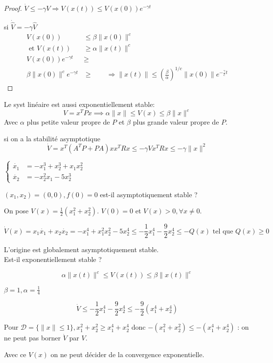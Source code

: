 \documentclass[main.tex]{subfiles} \newcommand{\D}{\mathcal{D}}
\begin{document}
\begin{proof} $\dot{V} \leq -\gamma V \Rightarrow V(x(t)) \leq
	V(x(0))e^{-\gamma t}$

  si $\dot{\hat{V}}=-\gamma \hat{V}$ \begin{align*} V(x(0)) & \leq \beta
	  \|x(0)\|^c \\ \text{ et } V(x(t)) & \geq \alpha \|x(t)\|^c \\
	  V(x(0))e^{-\gamma t} & \geq \\ \beta\|x(0)\|^c e^{-\gamma t} & \geq
	  \qquad \Rightarrow \|x(t)\| \leq
	  (\frac{\beta}{\alpha})^{1/c}\|x(0)\|e^{-\frac{\gamma}{c}t} \end{align*}
\end{proof}

\begin{corol} Le syst linéaire est aussi exponentiellement stable: \[ V = x^T P
x \implies \alpha \|x\| \le V(x) \le \beta \|x\|^c \] Avec $\alpha$ plus petite
valeur propre de $P$ et $\beta$ plus grande valeur propre de $P$.  \end{corol}
si on a la stabilité asymptotique \[ \dot{V}=x^T(A^TP+PA)x x^T R x \le -\gamma
V x^T R x \le -\gamma \|x\|^2 \] \begin{exemple} $\begin{cases} \dot{x_1} & =
	-x_1^3 + x_2 ^3 + x_1x_2^2\\\dot{x_2} & = - x_2^2 x_1 - 5x_2^3 \end{cases}$


  $(x_1,x_2)=(0,0),f(0)=0$ est-il asymptotiquement stable ?

  On pose $V(x) = \frac{1}{2}(x_1^2 + x_2^2)$. $V(0) = 0$ et $V(x)>0, \forall x
  \neq 0$.

  \[ \dot{V}(x) = x_1\dot{x_1} + x_2 \dot{x_2} = -x_1^4 + x_1^2 x_2^2 - 5 x_2^4
  \leq -\frac{1}{2}x_1^4 - \frac{9}{2}x_2^4 \leq - Q(x) \text{ tel que } Q(x)
  \geq 0 \]

  L'origine est globalement asymptotiquement stable.\\

  Est-il exponentiellement stable ?

  \[ \alpha \|x(t)\|^c \leq V(x(t)) \leq \beta \|x(t)\|^c \]

  $\beta=1,\alpha=\frac{1}{4}$

  \[ \dot{V} \leq - \frac{1}{2}x_1^4 - \frac{9}{2}x_2^4 \leq -\frac{9}{2}(x_1^4
  + x_2^4) \]

  Pour $\D = \{ \|x\| \leq 1 \}, x_1^2 +x_2^2 \geq x_1^4 + x_2^4$ donc $-(x_1^2
  + x_2^2) \leq -(x_1^4+x_2^4)$ : on ne peut pas borner $\dot{V}$ par $V$.

  Avec ce $V(x)$ on ne peut décider de la convergence exponentielle.
  \end{exemple}
\end{document}
